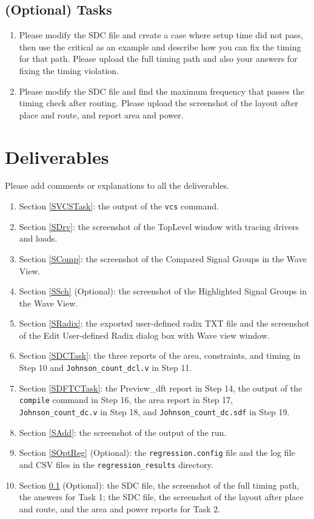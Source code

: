 \documentclass[a4paper,12pt,twoside]{article}
\begin{document}
\subsection{(Optional) Tasks}\label{SOptTask}
\begin{enumerate}
    \item Please modify the SDC file and create a case where setup time did not pass, then use the critical as an example and describe how you can fix the timing for that path. Please upload the full timing path and also your answers for fixing the timing violation.
    \item Please modify the SDC file and find the maximum frequency that passes the timing check after routing. Please upload the screenshot of the layout after place and route, and report area and power.
\end{enumerate}

\newpage
\section{Deliverables}
Please add comments or explanations to all the deliverables.
\begin{enumerate}
    \item Section \ref{SVCSTask}: the output of the \texttt{vcs} command.
    \item Section \ref{SDrv}: the screenshot of the TopLevel window with tracing drivers and loads.
    \item Section \ref{SComp}: the screenshot of the Compared Signal Groups in the Wave View.
    \item Section \ref{SSch} (Optional): the screenshot of the Highlighted Signal Groups in the Wave View.
    \item Section \ref{SRadix}: the exported user-defined radix TXT file and the screenshot of the Edit User-defined Radix dialog box with Wave view window.
    \item Section \ref{SDCTask}: the three reports of the area, constraints, and timing in Step 10 and \texttt{Johnson\_count\_dcl.v} in Step 11.
    \item Section \ref{SDFTCTask}: the Preview\_dft report in Step 14, the output of the \texttt{compile} command in Step 16, the area report in Step 17, \texttt{Johnson\_count\_dc.v} in Step 18, and \texttt{Johnson\_count\_dc.sdf} in Step 19.
    \item Section \ref{SAdd}: the screenshot of the output of the run.
    \item Section \ref{SOptReg} (Optional): the \texttt{regression.config} file and the log file and CSV files in the \texttt{regression\_results} directory.
    \item Section \ref{SOptTask} (Optional): the SDC file, the screenshot of the full timing path, the answers for Task 1; the SDC file, the screenshot of the layout after place and route, and the area and power reports for Task 2.
\end{enumerate}
\end{document}
